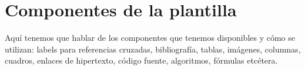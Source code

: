 \chapter{Componentes de la plantilla}
\label{ch:soa}

Aquí tenemos que hablar de los componentes que tenemos disponibles y cómo se utilizan: labels para referencias cruzadas, bibliografía, tablas, imágenes, columnas, cuadros, enlaces de hipertexto, código fuente, algoritmos, fórmulas etcétera.